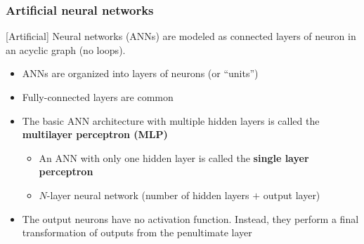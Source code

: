 \documentclass[smaller]{beamer}
\begin{document}
\begin{frame}
  \frametitle{Artificial neural networks}
  \pause

  [Artificial] Neural networks (ANNs) are modeled as connected layers of neuron in an acyclic graph (no loops).
  
  \begin{itemize}[<+->]
  \item ANNs are organized into layers of neurons (or ``units'')
  \item Fully-connected layers are common
  \item The basic ANN architecture with multiple hidden layers is called the \textbf{multilayer perceptron (MLP)}
    \begin{itemize}
    \item  An ANN with only one hidden layer is called the \textbf{single layer perceptron}
        \item $N$-layer neural network (number of hidden layers $+$ output layer)
  \end{itemize}
  \item The output neurons have no activation function. Instead, they perform a final transformation of outputs from the penultimate layer
  \end{itemize}
\end{frame}
\end{document}
